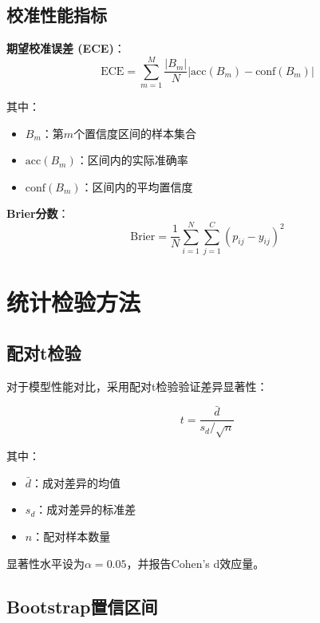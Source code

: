 \subsection{校准性能指标}
\label{app:calibration_metrics}

\textbf{期望校准误差 (ECE)}：
\begin{equation}
\text{ECE} = \sum_{m=1}^{M} \frac{|B_m|}{N} \left| \text{acc}(B_m) - \text{conf}(B_m) \right|
\label{eq:ece_detailed}
\end{equation}

其中：
\begin{itemize}
\item $B_m$：第$m$个置信度区间的样本集合
\item $\text{acc}(B_m)$：区间内的实际准确率
\item $\text{conf}(B_m)$：区间内的平均置信度
\end{itemize}

\textbf{Brier分数}：
\begin{equation}
\text{Brier} = \frac{1}{N} \sum_{i=1}^{N} \sum_{j=1}^{C} (p_{ij} - y_{ij})^2
\label{eq:brier_detailed}
\end{equation}

\section{统计检验方法}
\label{app:statistical_tests}

\subsection{配对t检验}
\label{app:paired_ttest}

对于模型性能对比，采用配对t检验验证差异显著性：

\begin{equation}
t = \frac{\bar{d}}{s_d / \sqrt{n}}
\label{eq:paired_ttest}
\end{equation}

其中：
\begin{itemize}
\item $\bar{d}$：成对差异的均值
\item $s_d$：成对差异的标准差  
\item $n$：配对样本数量
\end{itemize}

显著性水平设为$\alpha = 0.05$，并报告Cohen's d效应量。

\subsection{Bootstrap置信区间}
\label{app:bootstrap_ci}

